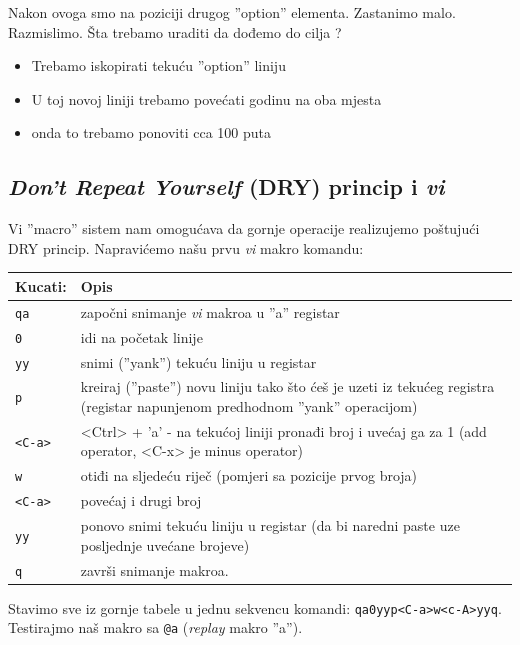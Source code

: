 \documentclass[times, utf8, seminar]{fit}
\begin{document}
Nakon ovoga smo na poziciji drugog ''option'' elementa. Zastanimo malo. Razmislimo. Šta trebamo uraditi da dođemo do cilja ? 
\begin{itemize}
  \item Trebamo iskopirati tekuću ''option'' liniju
  \item U toj novoj liniji trebamo povećati godinu na oba mjesta
  \item onda to trebamo ponoviti cca 100 puta
\end{itemize}

\subsection{\emph{Don't Repeat Yourself} (DRY) princip i \emph{vi}}
 
Vi ''macro'' sistem nam omogućava da gornje operacije realizujemo poštujući DRY princip. Napravićemo našu prvu \emph{vi} makro komandu:
\begin{center}
\begin{tabular}{ |p{4cm}|p{10cm}| }
  \hline                        
   Kucati:    &  Opis \\ 
   \hline
   \verb+qa+     & započni snimanje \emph{vi} makroa u ''a'' registar \\
   \verb+0+      & idi na početak linije \\
   \verb+yy+     & snimi (''yank'') tekuću liniju u registar \\
   \verb+p+      & kreiraj (''paste'') novu liniju tako što ćeš je uzeti iz tekućeg registra (registar napunjenom predhodnom ''yank'' operacijom) \\
   \verb+<C-a>+  & <Ctrl> + 'a' - na tekućoj liniji pronađi broj i uvećaj ga za 1 (add operator, <C-x> je minus operator) \\
   \verb+w+      & otiđi na sljedeću riječ (pomjeri sa pozicije prvog broja) \\
   \verb+<C-a>+  & povećaj i drugi broj \\
   \verb+yy+     & ponovo snimi tekuću liniju u registar (da bi naredni paste uze posljednje uvećane brojeve) \\
   \verb+q+      & završi snimanje makroa.\\
   \hline
\end{tabular}
\end{center}

Stavimo sve iz gornje tabele u jednu sekvencu komandi: \verb+qa0yyp<C-a>w<c-A>yyq+. \newline Testirajmo naš makro sa \verb+@a+ (\emph{replay} makro ''a''). 
\end{document}

